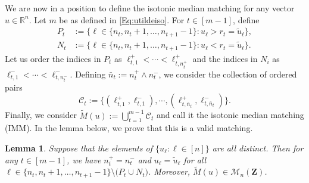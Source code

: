 \documentclass[12pt]{article}
\newtheorem{lemma}[theorem]{Lemma}
\newcommand{\bZ}{\mathbf{Z}}
\newcommand{\RR}{\mathbb{R}}
\begin{document}
We are now in a position to define the isotonic median matching for any vector $u\in \RR^n$. Let $m$ be as defined in \eqref{Eq:utildeiso}. For $t\in [m-1]$, define
\begin{align*}
P_t &:= \bigl\{\ell \in \{n_t,n_t+1,\ldots,n_{t+1}-1\}: u_\ell> r_t=\tilde{u}_\ell\bigr\}, \\
N_t &:= \bigl\{\ell \in \{n_t,n_t+1,\ldots,n_{t+1}-1\}: u_\ell< r_t=\tilde{u}_\ell\bigr\}.
\end{align*}
Let us order the indices in $P_t$ as $\ell_{t,1}^+<\cdots <\ell_{t,n_{t}^+}^+$ and the indices in $N_i$ as $\ell_{t,1}^-<\cdots< \ell_{t,n_t^-}^-$. Defining $\bar{n}_t:=n_t^+\wedge n_t^-$, we consider the collection of ordered pairs
\[
\mathcal{C}_t:=\bigl\{(\ell_{t,1}^+,\ell_{t,1}^-),\cdots,(\ell_{t,\bar{n}_t}^+,\ell_{t,\bar{n}_t}^-)\bigr\}.
\]
Finally, we consider
$\widetilde{M}(u):=\bigcup_{t=1}^{m-1} \mathcal{C}_t$ and call it the isotonic median matching (IMM). In the lemma below, we prove that this is a valid matching.
\begin{lemma}\label{lem:validity-of-IMM}
    Suppose that the elements of $\{u_\ell:\ell \in [n]\}$ are all distinct. Then for any $t\in [m-1]$, we have $n_t^+=n_t^-$ and 
    $u_\ell=\tilde{u}_\ell$ for all $\ell \in \{n_t,n_t+1,\ldots,n_{t+1}-1\} \setminus \bigl(P_t\cup N_t\bigr)$.
    Moreover, $\widetilde{M}(u)\in \mathcal{M}_n(\bZ)$.
\end{lemma}
\end{document}

